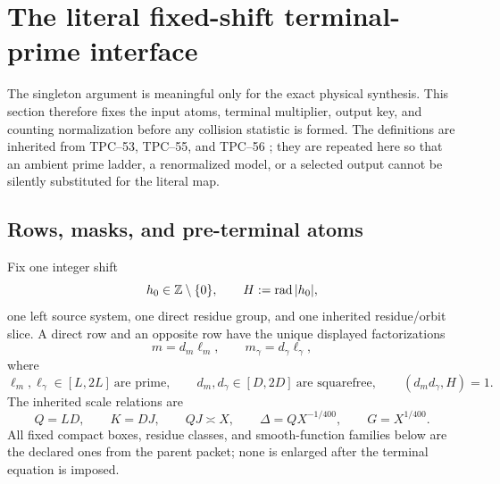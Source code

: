 \section{The literal fixed-shift terminal-prime interface}
\label{sec:tpc57-literal-interface}

The singleton argument is meaningful only for the exact physical synthesis.
This section therefore fixes the input atoms, terminal multiplier, output
key, and counting normalization before any collision statistic is formed.
The definitions are inherited from TPC--53, TPC--55, and TPC--56
\citep{WangTPC53,WangTPC55,WangTPC56}; they are repeated here so that an
ambient prime ladder, a renormalized model, or a selected output cannot be
silently substituted for the literal map.

\subsection{Rows, masks, and pre-terminal atoms}

Fix one integer shift
\begin{equation}
 h_0\in\mathbb Z\setminus\{0\},
 \qquad H:=\operatorname{rad}|h_0|,
 \label{eq:tpc57-fixed-shift}
\end{equation}
one left source system, one direct residue group, and one inherited
residue/orbit slice.  A direct row and an opposite row have the unique
displayed factorizations
\begin{equation}
 m=d_m\ell_m,
 \qquad
 m_\gamma=d_\gamma\ell_\gamma,
 \label{eq:tpc57-two-source-rows}
\end{equation}
where
\begin{equation}
 \ell_m,\ell_\gamma\in[L,2L]\ \text{are prime},
 \qquad
 d_m,d_\gamma\in[D,2D]\ \text{are squarefree},
 \qquad
 (d_md_\gamma,H)=1.
 \label{eq:tpc57-row-support}
\end{equation}
The inherited scale relations are
\begin{equation}
 Q=LD,
 \qquad K=DJ,
 \qquad QJ\asymp X,
 \qquad
 \Delta=QX^{-1/400},
 \qquad G=X^{1/400}.
 \label{eq:tpc57-literal-scales}
\end{equation}
All fixed compact boxes, residue classes, and smooth-function families below
are the declared ones from the parent packet; none is enlarged after the
terminal equation is imposed.

